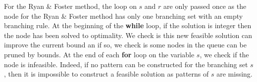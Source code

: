 For the Ryan \& Foster method, the loop on $s$ and $r$ are only passed once as the node for the Ryan \& Foster method has only one branching set with an empty branching rule. At the beginning of the \textbf{while} loop, if the solution is integer then the node has been solved to optimality. We check is this new feasible solution can improve the current bound an if so, we check is some nodes in the queue can be pruned by bounds. At the end of each \textbf{for} loop on the variable $s$, we check if the node is infeasible. Indeed, if no pattern can be constructed for the branching set $s$, then it is impossible to construct a feasible solution as patterns of $s$ are missing.
